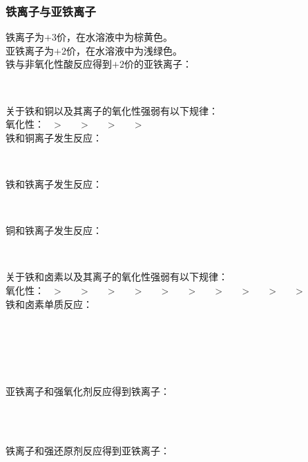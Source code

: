 \documentclass[UTF8]{ctexart}
\begin{document}
\newpage

\subsubsection{铁离子与亚铁离子}
    铁离子为$+3$价，在水溶液中为棕黄色。\\[3mm]
    亚铁离子为$+2$价，在水溶液中为浅绿色。\\[5mm]
    铁与非氧化性酸反应得到$+2$价的亚铁离子：
    \begin{center}
        \\[4mm]
    \end{center}
    关于铁和铜以及其离子的氧化性强弱有以下规律：\\[1mm]
    氧化性：~~>~~~~>~~~~>~~~~>~~\\[4mm]
    铁和铜离子发生反应：
    \begin{center}
        \\[3mm]
    \end{center}
    铁和铁离子发生反应：
    \begin{center}
        \\[3mm]
    \end{center}
    铜和铁离子发生反应：
    \begin{center}
        \\[8mm]
    \end{center}
    关于铁和卤素以及其离子的氧化性强弱有以下规律：\\[1mm]
    氧化性：~~>~~~~>~~~~>~~~~>~~~~>~~~~>~~~~>~~~~>~~~~>~~~~>~~\\[4mm]
    铁和卤素单质反应：
    \begin{center}
        \\[2mm]
        \\[2mm]
        \\[2mm]
        \\[6mm]
    \end{center}
    亚铁离子和强氧化剂反应得到铁离子：
    \begin{center}
        \\[2mm]
        \\[6mm]
    \end{center}
    铁离子和强还原剂反应得到亚铁离子：
    \begin{center}
    \end{center}
\end{document}
